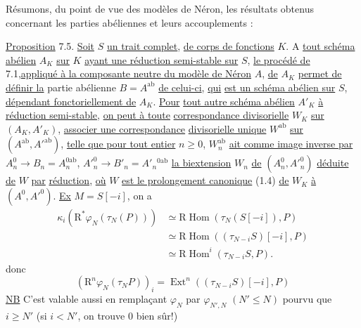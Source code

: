 Résumons, du point de vue des modèles de Néron, les résultats obtenus concernant
les parties abéliennes et leurs accouplements :

\uline{Proposition} 7.5. \uline{Soit} \(S\) \uline{un trait complet},
\uline{de corps de fonctions} \(K\). A \uline{tout schéma abélien} \(A_K\)
\uline{sur} \(K\) \uline{ayant une réduction semi-stable sur} \(S\),
\uline{le procédé de} 7.1,\uline{appliqué à la composante neutre du modèle de Néron}
\(A\), \uline{de} \(A_K\) \uline{permet de définir la} partie abélienne
\(B=A^{\mathrm{ab}}\) \uline{de celui-ci}, \uline{qui}
\uline{est un schéma abélien sur} \(S\), \uline{dépendant fonctoriellement de}
\(A_K\). \uline{Pour} \uline{tout autre schéma abélien} \(A'_K\)
\uline{à réduction semi-stable}, \uline{on peut à toute}
\uline{correspondance divisorielle} \(W_K\) \uline{sur} \((A_K,A'_K)\),
\uline{associer une correspondance} \uline{divisorielle unique} \(W^{\mathrm{ab}}\)
\uline{sur} \((A^{\mathrm{ab}},A'^{\mathrm{ab}})\),
\uline{telle que pour tout entier} \(n\geq0\), \(W_n^{\mathrm{ab}}\)
\uline{ait comme image inverse par}
\(A_n^0\longrightarrow B_n=A_n^{0\mathrm{ab}}\),
\(A'^0_n\longrightarrow B'_n=A'_n{}^{0\mathrm{ab}}\)
\uline{la biextension} \(W_n\) \uline{de} \((A_n^0,A'^0_n)\)
\uline{déduite de} \(W\) \uline{par} \uline{réduction}, \uline{où} \(W\)
\uline{est le prolongement canonique} (1.4) \uline{de} \(W_K\) \uline{à}
\((A^0,A'^0)\).
\uline{Ex} \(M=S[-i]\), on a
\[
\begin{aligned}
\kappa_i(\mathrm R^*\varphi_N(\tau_N(P)))
 &\simeq\mathrm R\operatorname{Hom}(\tau_N(S[-i]),P)\\
 &\simeq\mathrm R\operatorname{Hom}((\tau_{N-i}S)[-i],P)\\
 &\simeq\mathrm R\operatorname{Hom}^i(\tau_{N-i}S,P).
\end{aligned}
\]
donc
\[
(\mathrm R^n\varphi_N(\tau_NP))_i
 =\operatorname{Ext}^n((\tau_{N-i}S)[-i],P)
\]
\uline{NB} C'est valable aussi en remplaçant \(\varphi_N\) par
\(\varphi_{N',N}\) \((N'\leq N)\) pourvu que \(i\geq N'\)
(si \(i<N'\), on trouve \(0\) bien sûr!)
